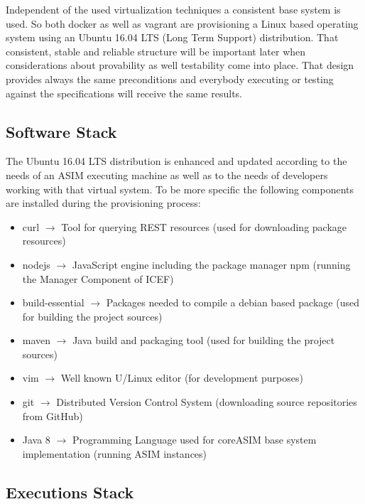 Independent of the used virtualization techniques a consistent base system is used. So both docker as well as vagrant are provisioning a Linux based operating system using an Ubuntu 16.04 LTS (Long Term Support) distribution.
That consistent, stable and reliable structure will be important later when considerations about provability as well testability come into place. That design provides always the same preconditions and everybody executing or testing against the specifications will receive the same results.

\subsection{Software Stack}

The Ubuntu 16.04 LTS distribution is enhanced and updated according to the needs of an ASIM executing machine as well as to the needs of developers working with that virtual system. To be more specific the following components are installed during the provisioning process:

\begin{itemize}
	\item curl $\rightarrow$ Tool for querying REST resources (used for downloading package resources)
	\item nodejs $\rightarrow$ JavaScript engine including the package manager npm (running the Manager Component of ICEF)
	\item build-essential $\rightarrow$ Packages needed to compile a debian based package (used for building the project sources)
	\item maven $\rightarrow$ Java build and packaging tool (used for building the project sources)
	\item vim $\rightarrow$ Well known U/Linux editor (for development purposes)
	\item git $\rightarrow$ Distributed Version Control System (downloading source repositories from GitHub)
	\item Java 8 $\rightarrow$ Programming Language used for coreASIM base system implementation (running ASIM instances)
\end{itemize}

\subsection{Executions Stack}


